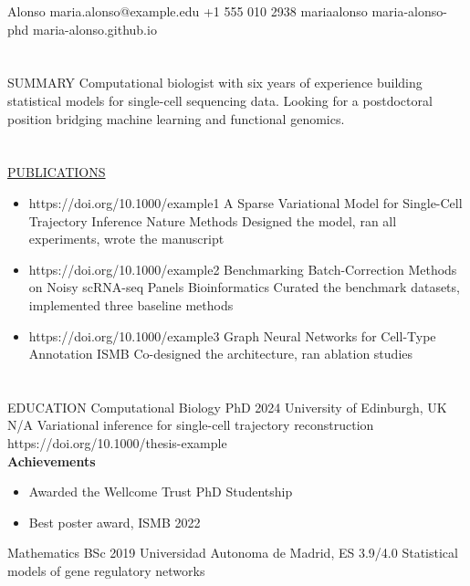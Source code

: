 \documentclass{my_cv}
\begin{document}
    {Alonso} %
    {maria.alonso@example.edu} %
    {+1 555 010 2938} %
    {mariaalonso} %
    {maria-alonso-phd} %
    {maria-alonso.github.io} %

\section{\faFile}{SUMMARY}
    Computational biologist with six years of experience building statistical
    models for single-cell sequencing data. Looking for a postdoctoral
    position bridging machine learning and functional genomics.

\section{\faBook}{\href{https://scholar.google.com/}{PUBLICATIONS}}
    \begin{itemize}
        \item
                {https://doi.org/10.1000/example1}
                {A Sparse Variational Model for Single-Cell Trajectory Inference}
                {Nature Methods}
                {Designed the model, ran all experiments, wrote the manuscript}
        \item
                {https://doi.org/10.1000/example2}
                {Benchmarking Batch-Correction Methods on Noisy scRNA-seq Panels}
                {Bioinformatics}
                {Curated the benchmark datasets, implemented three baseline methods}
        \item
                {https://doi.org/10.1000/example3}
                {Graph Neural Networks for Cell-Type Annotation}
                {ISMB}
                {Co-designed the architecture, ran ablation studies}
    \end{itemize}

\section{\faGraduationCap}{EDUCATION}
    \school
        {Computational Biology} %
        {PhD} %
        {2024} %
        {University of Edinburgh, UK} %
        {N/A} %
        {Variational inference for single-cell trajectory reconstruction} %
        {https://doi.org/10.1000/thesis-example} %
        \textbf{\\Achievements}
        \begin{itemize}
            \item Awarded the Wellcome Trust PhD Studentship
            \item Best poster award, ISMB 2022
        \end{itemize}
    \school
        {Mathematics}
        {BSc}
        {2019}
        {Universidad Autonoma de Madrid, ES}
        {3.9/4.0}
        {Statistical models of gene regulatory networks}
        {}
\end{document}
